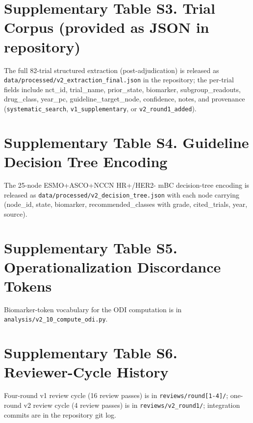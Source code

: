 \documentclass[11pt,a4paper]{article}
\begin{document}
\section*{Supplementary Table S3. Trial Corpus (provided as JSON in repository)}

The full 82-trial structured extraction (post-adjudication) is released as \texttt{data/processed/v2\_extraction\_final.json} in the repository; the per-trial fields include nct\_id, trial\_name, prior\_state, biomarker, subgroup\_readouts, drug\_class, year\_pc, guideline\_target\_node, confidence, notes, and provenance (\texttt{systematic\_search}, \texttt{v1\_supplementary}, or \texttt{v2\_round1\_added}).

\section*{Supplementary Table S4. Guideline Decision Tree Encoding}

The 25-node ESMO+ASCO+NCCN HR+/HER2- mBC decision-tree encoding is released as \texttt{data/processed/v2\_decision\_tree.json} with each node carrying (node\_id, state, biomarker, recommended\_classes with grade, cited\_trials, year, source).

\section*{Supplementary Table S5. Operationalization Discordance Tokens}

Biomarker-token vocabulary for the ODI computation is in \texttt{analysis/v2\_10\_compute\_odi.py}.

\section*{Supplementary Table S6. Reviewer-Cycle History}

Four-round v1 review cycle (16 review passes) is in \texttt{reviews/round[1-4]/}; one-round v2 review cycle (4 review passes) is in \texttt{reviews/v2\_round1/}; integration commits are in the repository git log.
\end{document}
